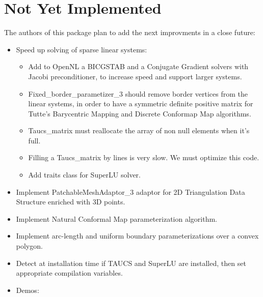 \section{Not Yet Implemented}

The authors of this package plan to add the next improvments in a close
future:

\begin{itemize}

\item Speed up solving of sparse linear systems:

    \begin{itemize}

    \item Add to OpenNL a BICGSTAB and a Conjugate Gradient solvers
    with Jacobi preconditioner, to increase speed and support larger systems.

    \item Fixed\_border\_parametizer\_3 should remove border vertices from
    the linear systems, in order to have a symmetric definite positive matrix
    for Tutte's Barycentric Mapping and Discrete Conformap Map algorithms.

    \item Taucs\_matrix must reallocate the array of non null elements when it's full.

    \item Filling a Taucs\_matrix by lines is very slow. We must optimize this code.

    \item Add traits class for SuperLU solver.

    \end{itemize}

\item Implement PatchableMeshAdaptor\_3 adaptor for 2D Triangulation
Data Structure enriched with 3D points.

\item Implement Natural Conformal Map parameterization algorithm.

\item Implement arc-length and uniform boundary parameterizations
      over a convex polygon.

\item Detect at installation time if TAUCS and SuperLU are installed,
      then set appropriate compilation variables.

\item Demos:

    \begin{itemize}


\end{itemize}
\end{itemize}

